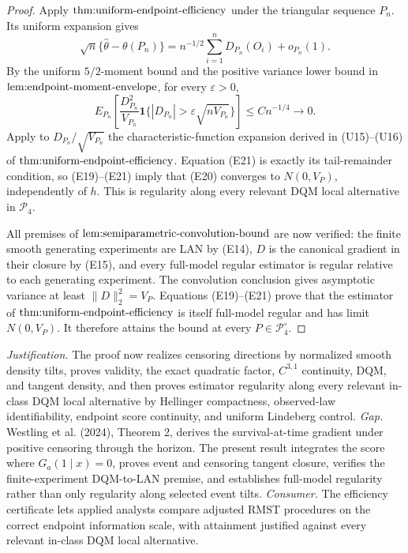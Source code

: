 \documentclass{article}
\begin{document}
\begin{proof}
Apply \(\textnormal{thm:uniform-endpoint-efficiency}\) under the triangular sequence \(P_n\).  Its uniform expansion gives
\[
 \sqrt n\{\widehat\theta-\theta(P_n)\}
 =n^{-1/2}\sum_{i=1}^nD_{P_n}(O_i)+o_{P_n}(1).                         \tag{E20}
\]
By the uniform \(5/2\)-moment bound and the positive variance lower bound in \(\textnormal{lem:endpoint-moment-envelope}\), for every \(\varepsilon>0\),
\[
 E_{P_n}\!\left[\frac{D_{P_n}^2}{V_{P_n}}
  \mathbf 1\{|D_{P_n}|>\varepsilon\sqrt{nV_{P_n}}\}\right]
 \le Cn^{-1/4}\longrightarrow0.                                      \tag{E21}
\]
Apply to \(D_{P_n}/\sqrt{V_{P_n}}\) the characteristic-function expansion derived in (U15)--(U16) of \(\textnormal{thm:uniform-endpoint-efficiency}\).  Equation (E21) is exactly its tail-remainder condition, so (E19)--(E21) imply that (E20) converges to \(N(0,V_P)\), independently of \(h\).  This is regularity along every relevant DQM local alternative in \(\mathcal P_4\).

All premises of \(\textnormal{lem:semiparametric-convolution-bound}\) are now verified: the finite smooth generating experiments are LAN by (E14), \(D\) is the canonical gradient in their closure by (E15), and every full-model regular estimator is regular relative to each generating experiment.  The convolution conclusion gives asymptotic variance at least \(\lVert D\rVert_2^2=V_P\).  Equations (E19)--(E21) prove that the estimator of \(\textnormal{thm:uniform-endpoint-efficiency}\) is itself full-model regular and has limit \(N(0,V_P)\).  It therefore attains the bound at every \(P\in\mathcal P_4^{\circ}\).
\end{proof}
\par\smallskip\noindent \textit{Justification.} The proof now realizes censoring directions by normalized smooth density tilts, proves validity, the exact quadratic factor, \(C^{3,1}\) continuity, DQM, and tangent density, and then proves estimator regularity along every relevant in-class DQM local alternative by Hellinger compactness, observed-law identifiability, endpoint score continuity, and uniform Lindeberg control. \textit{Gap.} Westling et al. (2024), Theorem 2, derives the survival-at-time gradient under positive censoring through the horizon. The present result integrates the score where \(G_a(1\mid x)=0\), proves event and censoring tangent closure, verifies the finite-experiment DQM-to-LAN premise, and establishes full-model regularity rather than only regularity along selected event tilts. \textit{Consumer.} The efficiency certificate lets applied analysts compare adjusted RMST procedures on the correct endpoint information scale, with attainment justified against every relevant in-class DQM local alternative.
\end{document}
